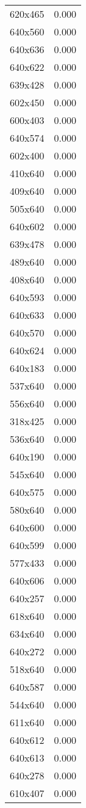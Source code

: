 \begin{table}
\begin{tabular}{lr}
620x465 & 0.000 \\
640x560 & 0.000 \\
640x636 & 0.000 \\
640x622 & 0.000 \\
639x428 & 0.000 \\
602x450 & 0.000 \\
600x403 & 0.000 \\
640x574 & 0.000 \\
602x400 & 0.000 \\
410x640 & 0.000 \\
409x640 & 0.000 \\
505x640 & 0.000 \\
640x602 & 0.000 \\
639x478 & 0.000 \\
489x640 & 0.000 \\
408x640 & 0.000 \\
640x593 & 0.000 \\
640x633 & 0.000 \\
640x570 & 0.000 \\
640x624 & 0.000 \\
640x183 & 0.000 \\
537x640 & 0.000 \\
556x640 & 0.000 \\
318x425 & 0.000 \\
536x640 & 0.000 \\
640x190 & 0.000 \\
545x640 & 0.000 \\
640x575 & 0.000 \\
580x640 & 0.000 \\
640x600 & 0.000 \\
640x599 & 0.000 \\
577x433 & 0.000 \\
640x606 & 0.000 \\
640x257 & 0.000 \\
618x640 & 0.000 \\
634x640 & 0.000 \\
640x272 & 0.000 \\
518x640 & 0.000 \\
640x587 & 0.000 \\
544x640 & 0.000 \\
611x640 & 0.000 \\
640x612 & 0.000 \\
640x613 & 0.000 \\
640x278 & 0.000 \\
610x407 & 0.000 \\

\end{tabular}
\end{table}
